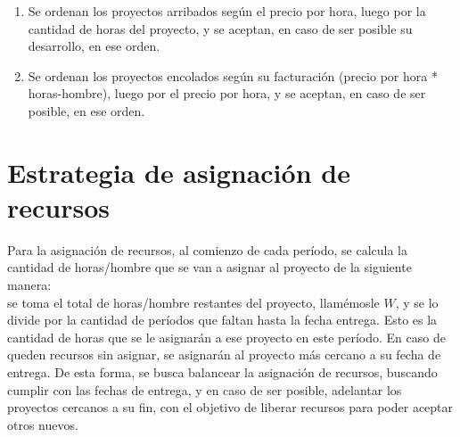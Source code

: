 \begin{enumerate}
    \item Se ordenan los proyectos arribados según el precio por hora, luego por la cantidad de horas del proyecto, y se aceptan, en caso de ser posible su desarrollo, en ese orden.\\

    \item Se ordenan los proyectos encolados según su facturación (precio por hora * horas-hombre), luego por el precio por hora, y se aceptan, en caso de ser posible, en ese orden.\\
\end{enumerate}



\section{Estrategia de asignación de recursos}

Para la asignación de recursos, al comienzo de cada período, se calcula la cantidad de horas/hombre que se van a asignar al proyecto de la siguiente manera: \\
se toma el total de horas/hombre restantes del proyecto, llamémosle $W$, y se lo divide por la 
cantidad de períodos que faltan hasta la fecha entrega. Esto es la cantidad de horas que se le asignarán a ese proyecto en este período.
En caso de queden recursos sin asignar, se asignarán al proyecto más cercano a su fecha de entrega. 
De esta forma, se busca balancear la asignación de recursos, buscando cumplir con las fechas de entrega, y en caso de ser posible, adelantar los proyectos 
cercanos a su fin, con el objetivo de liberar recursos para poder aceptar otros nuevos.
